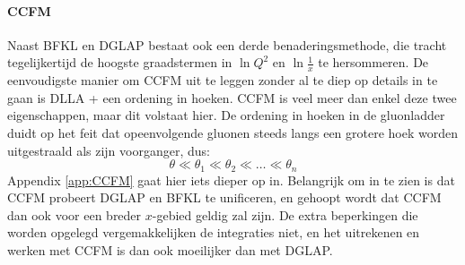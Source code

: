 \documentclass[a4paper,11pt]{article}
\numberwithin{equation}{section} %
\begin{document}
      \paragraph{CCFM}
Naast BFKL en DGLAP bestaat ook een derde benaderingsmethode, die tracht tegelijkertijd de hoogste graadstermen in $\ln{Q^2}$ en $\ln{\frac{1}{x}}$ te hersommeren.
De eenvoudigste manier om CCFM uit te leggen zonder al te diep op details in te gaan is DLLA + een ordening in hoeken.
CCFM is veel meer dan enkel deze twee eigenschappen, maar dit volstaat hier.
De ordening in hoeken in de gluonladder duidt op het feit dat opeenvolgende gluonen steeds langs een grotere hoek worden uitgestraald als zijn voorganger, dus:
\begin{equation} \label{eq:HoekOrdening}
\theta \ll \theta_1 \ll \theta_2 \ll \hdots \ll \theta_n
\end{equation}
Appendix \ref{app:CCFM} gaat hier iets dieper op in.
Belangrijk om in te zien is dat CCFM probeert DGLAP en BFKL te unificeren, en gehoopt wordt dat CCFM dan ook voor een breder $x$-gebied geldig zal zijn.
De extra beperkingen die worden opgelegd vergemakkelijken de integraties niet, en het uitrekenen en werken met CCFM is dan ook moeilijker dan met DGLAP.
\end{document}
